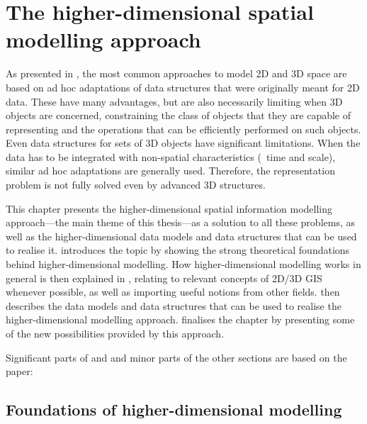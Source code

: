 
\chapter{The higher-dimensional spatial modelling approach}
\label{ch:nd-modelling}

As presented in , the most common approaches to model 2D and 3D space are based on ad hoc adaptations of data structures that were originally meant for 2D data.
These have many advantages, but are also necessarily limiting when 3D objects are concerned, constraining the class of objects that they are capable of representing and the operations that can be efficiently performed on such objects.
Even data structures for sets of 3D objects have significant limitations.
When the data has to be integrated with non-spatial characteristics (\eg\ time and scale), similar ad hoc adaptations are generally used.
Therefore, the representation problem is not fully solved even by advanced 3D structures.

This chapter presents the higher-dimensional spatial information modelling approach---the main theme of this thesis---as a solution to all these problems, as well as the higher-dimensional data models and data structures that can be used to realise it.
 introduces the topic by showing the strong theoretical foundations behind higher-dimensional modelling.
How higher-dimensional modelling works in general is then explained in , relating to relevant concepts of 2D/3D GIS whenever possible, as well as importing useful notions from other fields.
 then describes the data models and data structures that can be used to realise the higher-dimensional modelling approach.
 finalises the chapter by presenting some of the new possibilities provided by this approach.

Significant parts of  and  and minor parts of the other sections are based on the paper:
\begin{itemize}
\paperijgisndstructures%
\end{itemize}

\section{Foundations of higher-dimensional modelling}
\label{se:nd-modelling-foundations}

